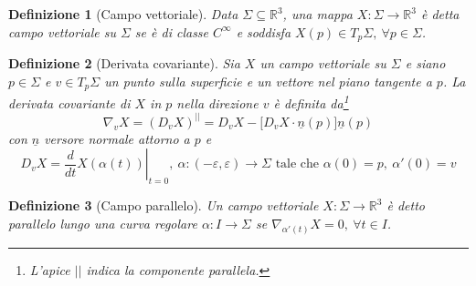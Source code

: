 \documentclass[12pt]{scrartcl}
\theoremstyle{style}
\newtheorem{definizione}{Definizione}[section]
\newcommand*\Eval[3]{\left.#1\right\rvert_{#2}^{#3}}
\numberwithin{equation}{subsection}
\begin{document}
\begin{definizione}
	[Campo vettoriale]
	Data $\Sigma \subseteq \mathbb{R}^3$, una mappa $X:\Sigma \to \mathbb{R}^3$ \`e detta \textit{campo vettoriale} su $\Sigma$ se \`e di classe $C^\infty$ e soddisfa $X(p) \in T_p\Sigma, \ \forall p \in \Sigma$.
\end{definizione}
\begin{definizione}
	[Derivata covariante]
	Sia $X$ un campo vettoriale su $\Sigma$ e siano $p \in \Sigma$ e $v \in T_p\Sigma$ un punto sulla superficie e un vettore nel piano tangente a $p$.
	La \textit{derivata covariante} di $X$ in $p$ nella direzione $v$ \`e definita da\footnote{L'apice $| |$ indica la componente parallela.}
	\[
		\nabla _v X = (D_v X)^{| |}  = D_v X - \big[D_v X \cdot \underline{n}(p)\big]\underline{n}(p)
	\]
	con $\underline{n}$ versore normale attorno a $p$ e 
	\[
		D_v X = \Eval{\frac{d }{d t} X(\alpha (t))}{t=0}{}, \ \alpha :(-\varepsilon ,\varepsilon )\to \Sigma \text{ tale che } \alpha (0) =p , \ \alpha '(0) = v
	\] 
\end{definizione}
	\begin{definizione}
		[Campo parallelo]
		Un campo vettoriale $X : \Sigma \to \mathbb{R}^3$ \`e detto \textit{parallelo} lungo una curva regolare $\alpha : I \to \Sigma$ se $\nabla _{\alpha '(t)} X = 0, \ \forall t \in I$.
	\end{definizione}
\end{document}
